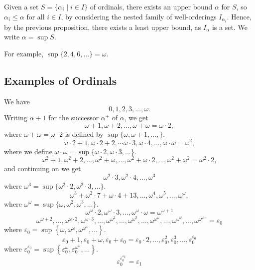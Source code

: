 \documentclass[a4paper]{scrartcl}
\begin{document}
\begin{remark}
  Given a set $S = \{\alpha_i \mid i \in I\}$ of ordinals, there exists an upper bound $\alpha$ for $S$, so $\alpha_i \leq \alpha$ for all $i \in I$, by considering the nested family of well-orderings $I_{\alpha_i}$. Hence, by the previous proposition, there exists a least upper bound, as $I_\alpha$ is a set. We write $\alpha = \sup S$. 

  For example, $\sup \{2, 4, 6, \dots\} = \omega$. 
\end{remark}

\subsection{Examples of Ordinals}

We have
$$
0, 1, 2, 3, \dots, \omega.
$$
Writing $\alpha + 1$ for the successor $\alpha^+$ of $\alpha$, we get
$$
\omega+1, \omega+2, \dots, \omega + \omega = \omega \cdot 2,
$$
where $\omega + \omega = \omega \cdot 2$ is defined by $\sup \{\omega, \omega + 1, \dots, \}$.
$$
\omega\cdot 2 + 1, \omega \cdot 2 + 2, \dotsm \omega \cdot 3, \omega \cdot 4, \dots, \omega \cdot \omega = \omega^2,
$$
where we define $\omega \cdot \omega = \sup \{\omega \cdot 2, \omega \cdot 3, \dots\}$.
$$
\omega^2 + 1, \omega^2 + 2, \dots, \omega^2 + \omega, \dots, \omega^2 + \omega \cdot 2, \dots, \omega^2 + \omega^2 = \omega^2 \cdot 2,
$$
and continuing on we get
$$
\omega^2 \cdot 3, \omega^2 \cdot 4, \dots, \omega^3
$$
where $\omega^3 = \sup \{\omega^2 \cdot 2, \omega^2 \cdot 3, \dots\}$.
$$
\omega^3 + \omega^2 \cdot 7 + \omega \cdot 4 + 13, \dots, \omega^4, \omega^5, \dots, \omega^{\omega},
$$
where $\omega^\omega = \sup\{\omega, \omega^2, \omega^3, \dots\}$.
$$
\omega^\omega \cdot 2, \omega^\omega \cdot 3, \ldots, \omega^\omega \cdot \omega=\omega^{\omega+1}
$$
$$
\omega^{\omega+2}, \ldots, \omega^{\omega \cdot 2}, \omega^{\omega \cdot 3}, \ldots, \omega^{\omega^2}, \ldots, \omega^{\omega^3}, \ldots, \omega^{\omega^\omega}, \ldots, \omega^{\omega^\omega}, \ldots, \omega^{\omega^{\omega \cdots}}=\varepsilon_0
$$
where $\varepsilon_0=\sup \left\{\omega, \omega^\omega, \omega^{\omega^\omega}, \ldots\right\}$.
$$
\varepsilon_0+1, \varepsilon_0+\omega, \varepsilon_0+\varepsilon_0=\varepsilon_0 \cdot 2, \ldots, \varepsilon_0^2, \varepsilon_0^3, \ldots, \varepsilon_0^{\varepsilon_0}
$$
where $\varepsilon_0^{\varepsilon_0}=\sup \left\{\varepsilon_0^\omega, \varepsilon_0^{\omega^\omega}, \ldots\right\}$.
$$
\varepsilon_0^{\varepsilon_0^{\varepsilon_0^{\cdots}}}=\varepsilon_1
$$
\end{document}
